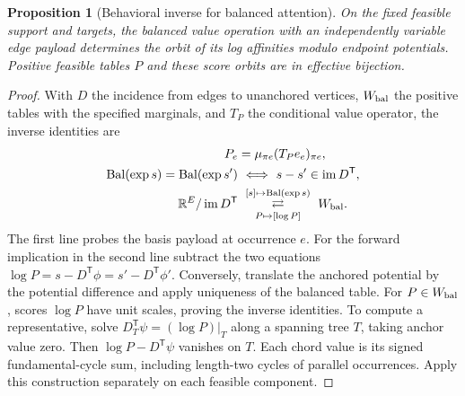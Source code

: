 \documentclass[11pt,a4paper]{article}
\newtheorem{proposition}[proposition]{Proposition}
\theoremstyle{definition}
\theoremstyle{remark}\newaliascnt{remark}{theorem}
\newcommand{\R}{\mathbb R}
\numberwithin{equation}{section}
\begin{document}
\begin{proposition}[Behavioral inverse for balanced attention]\label{thm:global-balance-inverse}
On the fixed feasible support and targets, the balanced value operation with an independently variable edge payload determines the orbit of its log affinities modulo endpoint potentials. Positive feasible tables $P$ and these score orbits are in effective bijection.
\end{proposition}
\begin{proof}
With \(D\) the incidence from edges to unanchored vertices, \(W_{\rm bal}\) the positive tables with the specified marginals, and \(T_P\) the conditional value operator, the inverse identities are
\[
\begin{aligned}
 P_e&=\mu_{\pi e}(T_P e_e)_{\pi e},\\
 \operatorname{Bal}(\exp s)=\operatorname{Bal}(\exp s')
   &\ \Longleftrightarrow\ s-s'\in\operatorname{im}D^{\mathsf T},\\
 \R^E/\operatorname{im}D^{\mathsf T}
   &\ \underset{P\mapsto[\log P]}{\overset{[s]\mapsto\operatorname{Bal}(\exp s)}{\rightleftarrows}}\ W_{\rm bal}.
\end{aligned}
\]
The first line probes the basis payload at occurrence \(e\). For the forward implication in the second line subtract the two equations \(\log P=s-D^{\mathsf T}\phi=s'-D^{\mathsf T}\phi'\). Conversely, translate the anchored potential by the potential difference and apply uniqueness of the balanced table. For \(P\in W_{\rm bal}\), scores \(\log P\) have unit scales, proving the inverse identities. To compute a representative, solve \(D_T^{\mathsf T}\psi=(\log P)|_T\) along a spanning tree \(T\), taking anchor value zero. Then \(\log P-D^{\mathsf T}\psi\) vanishes on \(T\). Each chord value is its signed fundamental-cycle sum, including length-two cycles of parallel occurrences. Apply this construction separately on each feasible component.
\end{proof}
\end{document}
